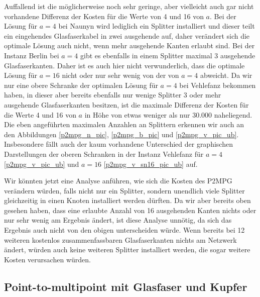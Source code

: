 \documentclass[11pt,a4paper]{article}
\theoremstyle{my_th_style1}
\begin{document}
Auffallend ist die m\"oglicherweise noch sehr geringe, aber vielleicht auch gar nicht vorhandene Differenz der Kosten f\"ur die Werte von 4 und 16 von \(a\).
Bei der L\"osung f\"ur \(a=4\) bei Naunyn wird lediglich ein Splitter installiert und dieser teilt ein eingehendes Glasfaserkabel in zwei ausgehende auf, daher ver\"andert sich die optimale L\"osung auch nicht, wenn mehr ausgehende Kanten erlaubt sind.
Bei der Instanz Berlin bei \(a=4\) gibt es ebenfalls in einem Splitter maximal 3 ausgehende Glasfaserkanten.
Daher ist es auch hier nicht verwunderlich, dass die optimale L\"osung f\"ur \(a=16\) nicht oder nur sehr wenig von der von \(a=4\) abweicht.
Da wir nur eine obere Schranke der optimalen L\"osung f\"ur \(a=4\) bei Vehlefanz bekommen haben, in dieser aber bereits ebenfalls nur wenige Splitter 3 oder mehr ausgehende Glasfaserkanten besitzen, ist die maximale Differenz der Kosten f\"ur die Werte 4 und 16 von \(a\) in H\"ohe von etwas weniger als nur 30.000 naheliegend.
Die eben angef\"uhrten maximalen Anzahlen an Splittern erkennen wir auch an den Abbildungen \eqref{p2mpg_n_pic}, \eqref{p2mpg_b_pic} und \eqref{p2mpg_v_pic_ub}.
Insbesondere f\"allt auch der kaum vorhandene Unterschied der graphischen Darstellungen der oberen Schranken in der Instanz Vehlefanz f\"ur \(a=4\) \eqref{p2mpg_v_pic_ub} und \(a=16\) \eqref{p2mpg_v_sn16_pic_ub} auf.

Wir k\"onnten jetzt eine Analyse anf\"uhren, wie sich die Kosten des P2MPG ver\"andern w\"urden, falls nicht nur ein Splitter, sondern unendlich viele Splitter gleichzeitig in einen Knoten installiert werden d\"urften.
Da wir aber bereits oben gesehen haben, dass eine erlaubte Anzahl von 16 ausgehenden Kanten nichts oder nur sehr wenig am Ergebnis \"andert, ist diese Analyse unn\"otig, da sich das Ergebnis auch nicht von den obigen unterscheiden w\"urde.
Wenn bereits bei 12 weiteren kostenlos zusammenfassbaren Glasfaserkanten nichts am Netzwerk \"andert, w\"urden auch keine weiteren Splitter installiert werden, die sogar weitere Kosten verursachen w\"urden.
 
\subsection{Point-to-multipoint mit Glasfaser und Kupfer}
\end{document}
